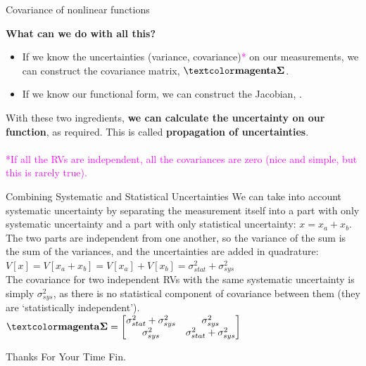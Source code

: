 \documentclass[10pt,sans,english,compress,xcolor=dvipsnames]{beamer}
\begin{document}
\begin{frame}{Covariance of nonlinear functions}
\small

\textbf{What can we do with all this?}\\[1ex]

\footnotesize
\begin{itemize}
\item If we know the uncertainties (variance, covariance)\textcolor{magenta}{*} on our measurements, we can construct the covariance matrix, $\covmat$. 
\item If we know our functional form, we can construct the Jacobian, .
\end{itemize}
\vspace{0.5cm}

With these two ingredients, \textbf{we can calculate the uncertainty on our function}, as required. This is called  \textbf{propagation of uncertainties}.\\[1ex]

\\[1ex]

\textcolor{magenta}{*If all the RVs are independent, all the covariances are zero (nice and simple, but this is rarely true).}

\end{frame} 


\begin{frame}{Combining Systematic and Statistical Uncertainties}
\footnotesize
We can take into account systematic uncertainty by separating the measurement itself into a part with only systematic uncertainty and a part with only statistical uncertainty: $x = x_{a}+x_{b}$. \\[1ex]

The two parts are independent from one another, so the variance of the sum is the sum of the variances, and the uncertainties are added in quadrature:\\[1ex]

$V[x]  = V [x_a + x_b] =  V[x_a] + V[x_b]  =\sigma^2_{stat} + \sigma^2_{sys}$ \\

The covariance for two independent RVs with the same systematic uncertainty is simply $\sigma^2_{sys}$, as there is no statistical component of covariance between them (they are `statistically independent').\\[1ex]

$
\covmat = \begin{bmatrix}
\sigma^2_{stat} + \sigma^2_{sys} & \sigma^2_{sys}\\
\sigma^2_{sys} & \sigma^2_{stat} + \sigma^2_{sys} \\
\end{bmatrix}
$
\end{frame} 


\begin{frame}{Thanks For Your Time}
\center
\Huge
Fin.
\end{frame}
\end{document}
